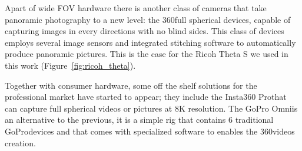 Apart of wide FOV hardware there is another class of  
cameras that take panoramic photography to a new level: 
the 360\degree full spherical devices, capable of capturing images
in every directions with no blind sides. This class of devices employs 
several image sensors and integrated stitching software to automatically produce
panoramic pictures. This is the case for the Ricoh Theta S\texttrademark 
\cite{theta_website} we used in this work (Figure~\ref{fig:ricoh_theta}).

Together with consumer hardware, some off the shelf
solutions for the professional market have started to appear; they include the Insta360
Pro\registered that can capture full spherical videos or pictures
at 8K resolution.
The GoPro Omni\registered is an alternative to the previous, it is a simple 
rig that contains 6 traditional GoPro\registered devices and that comes with 
specialized software to enables the 360\degree videos 
creation.

